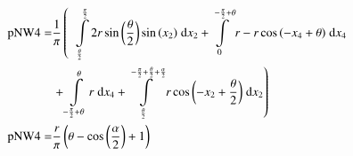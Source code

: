 \begin{align}
    \mathrm{pNW4} =&\frac{1}{\pi} \left(\;\;\int\limits_{\frac{\theta}{2}}^{\frac{\pi}{2}}2 r \sin{\left (\frac{\theta}{2} \right )} \sin{\left (x_{2} \right )}\;\mathrm{d}x_{2}+\int\limits_{0}^{- \frac{\pi}{2} + \theta}r - r \cos{\left (- x_{4} + \theta \right )}\;\mathrm{d}x_{4}\right.\notag\\
 &\left.+\int\limits_{- \frac{\pi}{2} + \theta}^{\theta}r\;\mathrm{d}x_{4}+\int\limits_{\frac{\theta}{2}}^{- \frac{\pi}{2} + \frac{\theta}{2} + \frac{\alpha}{2}}r \cos{\left (- x_{2} + \frac{\theta}{2} \right )}\;\mathrm{d}x_{2}\right)\label{pNW4Def}\\
    \mathrm{pNW4} =& \frac{r}{\pi} \left(\theta - \cos{\left (\frac{\alpha}{2} \right )} + 1\right)\label{pNW4Sln}
\end{align}